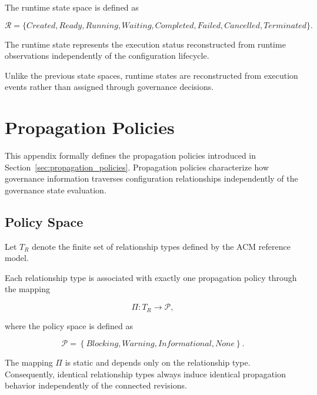 \documentclass[10pt]{article}
\begin{document}
The runtime state space is defined as

\begin{equation}
	\mathcal{R}=
	\{
	Created,
	Ready,
	Running,
	Waiting,
	Completed,
	Failed,
	Cancelled,
	Terminated
	\}.
	\label{eq:runtime_space}
\end{equation}

The runtime state represents the execution status reconstructed from runtime observations independently of the configuration lifecycle.

Unlike the previous state spaces, runtime states are reconstructed from execution events rather than assigned through governance decisions.



\section{Propagation Policies}
\label{appendix:propagation_policies}

This appendix formally defines the propagation policies introduced in Section~\ref{sec:propagation_policies}. Propagation policies characterize how governance information traverses configuration relationships independently of the governance state evaluation.

\subsection{Policy Space}

Let $T_R$ denote the finite set of relationship types defined by the ACM reference model.

Each relationship type is associated with exactly one propagation policy through the mapping

\begin{equation}
	\Pi : T_R \rightarrow \mathcal{P},
	\label{eq:policy_function}
\end{equation}

where the policy space is defined as

\begin{equation}
	\mathcal{P}=
	\left\{
	\textit{Blocking},
	\textit{Warning},
	\textit{Informational},
	\textit{None}
	\right\}.
	\label{eq:policy_set}
\end{equation}

The mapping $\Pi$ is static and depends only on the relationship type. Consequently, identical relationship types always induce identical propagation behavior independently of the connected revisions.
\end{document}
